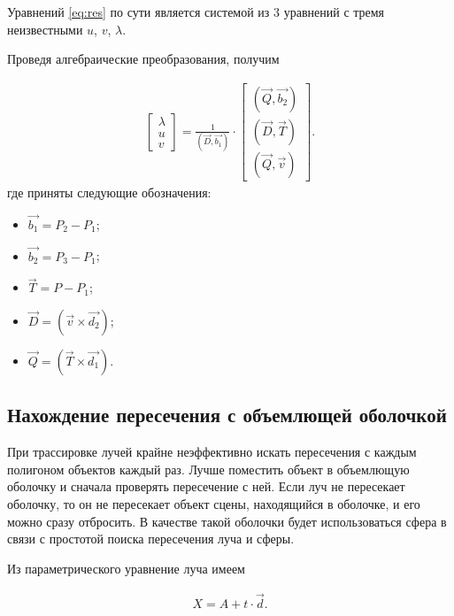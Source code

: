 Уравнений \ref{eq:res} по сути является системой из 3 уравнений с тремя неизвестными $u$, $v$, $\lambda$.

Проведя алгебраические преобразования, получим

\begin{equation} \label{eq:res}
	\begin{aligned}
	\begin{bmatrix}
		\lambda\\
		u\\
		v
	\end{bmatrix}
	= \frac{1}{(\vec{D}, \vec{b_{1}})}\cdot 
	\begin{bmatrix}
		(\vec{Q}, \vec{b_{2}})\\
		(\vec{D}, \vec{T})\\
		(\vec{Q}, \vec{v})
	\end{bmatrix}.
	\end{aligned}
\end{equation}
где приняты следующие обозначения: 
\begin{itemize}[label=---]
	\item $\vec{b_{1}} = P_{2} - P_{1}$;
	\item $\vec{b_{2}} = P_{3} - P_{1}$;
	\item $\vec{T} = P - P_{1}$;
	\item $\vec{D} = (\vec{v} \times \vec{d_{2}})$;
	\item $\vec{Q} = (\vec{T} \times \vec{d_{1}})$.
\end{itemize}

\subsection{Нахождение пересечения с объемлющей оболочкой}

При трассировке лучей крайне неэффективно искать пересечения с каждым полигоном объектов каждый раз. Лучше поместить объект в объемлющую оболочку и сначала проверять пересечение с ней. Если луч не пересекает оболочку, то он не пересекает объект сцены, находящийся в оболочке, и его можно сразу отбросить. В качестве такой оболочки будет использоваться сфера в связи с простотой поиска пересечения луча и сферы.


Из параметрического уравнение луча имеем 

\begin{equation} \label{eq:dsfs}
	\begin{aligned}
		X = A + t\cdot \vec{d}.
	\end{aligned}
\end{equation}

